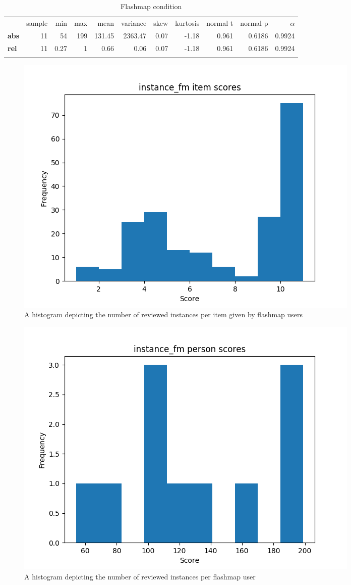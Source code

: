 \begin{longtable}[c]{@{}lrrrrrrrrrr@{}}
    \caption{Flashmap condition}
    \endfirsthead
    \endhead
\toprule\addlinespace
& sample & min & max & mean & variance & skew & kurtosis & normal-t &
normal-p & $\alpha$
\\\addlinespace
\midrule
\textbf{abs} & 11 & 54 & 199 & 131.45 & 2363.47 & 0.07 & -1.18 & 0.961 &
0.6186 & 0.9924
\\\addlinespace
\textbf{rel} & 11 & 0.27 & 1 & 0.66 & 0.06 & 0.07 & -1.18 & 0.961 & 0.6186
& 0.9924
\\\addlinespace
\bottomrule
    \label{tab:instance_fm}
\end{longtable}

\begin{figure}
    \centering
    \includegraphics[width=.7\textwidth]{img/instance_fm_diff.png}
    \caption{A histogram depicting the number of reviewed instances per item given by flashmap users}
    \label{fig:instance_fm_diff}
\end{figure}
\begin{figure}
    \centering
    \includegraphics[width=.7\textwidth]{img/instance_fm_abil.png}
    \caption{A histogram depicting the number of reviewed instances per flashmap user}
    \label{fig:instance_fm_abil}
\end{figure}

